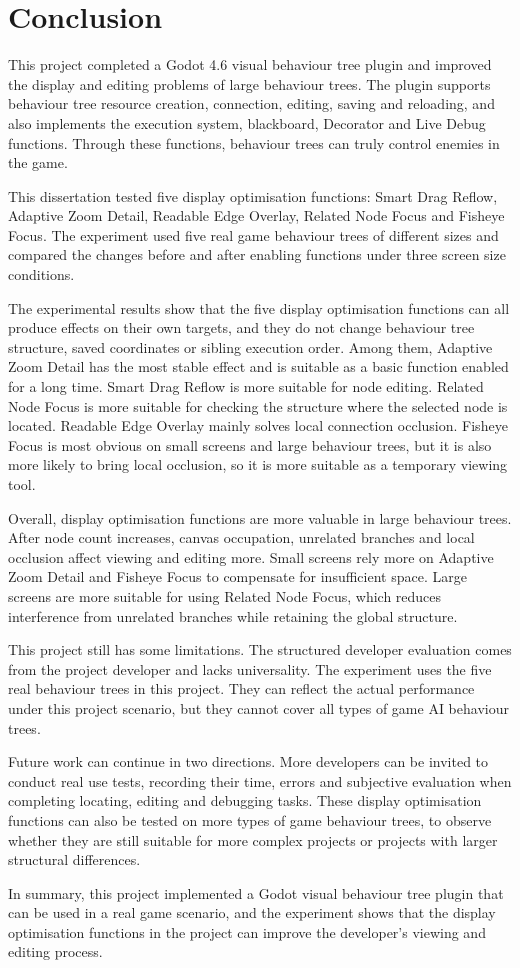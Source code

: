 \chapter{Conclusion}

This project completed a Godot 4.6 visual behaviour tree plugin and improved the display and editing problems of large behaviour trees. The plugin supports behaviour tree resource creation, connection, editing, saving and reloading, and also implements the execution system, blackboard, Decorator and Live Debug functions. Through these functions, behaviour trees can truly control enemies in the game.

This dissertation tested five display optimisation functions: Smart Drag Reflow, Adaptive Zoom Detail, Readable Edge Overlay, Related Node Focus and Fisheye Focus. The experiment used five real game behaviour trees of different sizes and compared the changes before and after enabling functions under three screen size conditions.

The experimental results show that the five display optimisation functions can all produce effects on their own targets, and they do not change behaviour tree structure, saved coordinates or sibling execution order. Among them, Adaptive Zoom Detail has the most stable effect and is suitable as a basic function enabled for a long time. Smart Drag Reflow is more suitable for node editing. Related Node Focus is more suitable for checking the structure where the selected node is located. Readable Edge Overlay mainly solves local connection occlusion. Fisheye Focus is most obvious on small screens and large behaviour trees, but it is also more likely to bring local occlusion, so it is more suitable as a temporary viewing tool.

Overall, display optimisation functions are more valuable in large behaviour trees. After node count increases, canvas occupation, unrelated branches and local occlusion affect viewing and editing more. Small screens rely more on Adaptive Zoom Detail and Fisheye Focus to compensate for insufficient space. Large screens are more suitable for using Related Node Focus, which reduces interference from unrelated branches while retaining the global structure.

This project still has some limitations. The structured developer evaluation comes from the project developer and lacks universality. The experiment uses the five real behaviour trees in this project. They can reflect the actual performance under this project scenario, but they cannot cover all types of game AI behaviour trees.

Future work can continue in two directions. More developers can be invited to conduct real use tests, recording their time, errors and subjective evaluation when completing locating, editing and debugging tasks. These display optimisation functions can also be tested on more types of game behaviour trees, to observe whether they are still suitable for more complex projects or projects with larger structural differences.

In summary, this project implemented a Godot visual behaviour tree plugin that can be used in a real game scenario, and the experiment shows that the display optimisation functions in the project can improve the developer's viewing and editing process.
